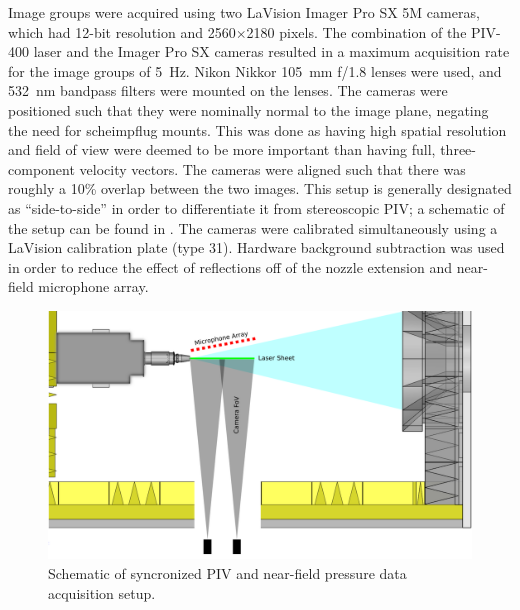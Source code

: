 Image groups were acquired using two LaVision Imager Pro SX 5M cameras, which had 12-bit resolution and 2560$\times$2180 pixels.
The combination of the PIV-400 laser and the Imager Pro SX cameras resulted in a maximum acquisition rate for the image groups of 5~Hz.
Nikon Nikkor 105~mm f/1.8 lenses were used, and 532~nm bandpass filters were mounted on the lenses.
The cameras were positioned such that they were nominally normal to the image plane, negating the need for scheimpflug mounts.
This was done as having high spatial resolution and field of view were deemed to be more important than having full, three-component velocity vectors.
The cameras were aligned such that there was roughly a 10\% overlap between the two images.
This setup is generally designated as ``side-to-side'' in order to differentiate it from stereoscopic PIV; a schematic of the setup can be found in .
The cameras were calibrated simultaneously using a LaVision calibration plate (type 31). 
Hardware background subtraction was used in order to reduce the effect of reflections off of the nozzle extension and near-field microphone array.
\begin{figure}
	\centering
	\includegraphics[width=6in]{Figures/ch2_piv_setup.png}
	\caption{Schematic of syncronized PIV and near-field pressure data acquisition setup.}
	\label{fig:piv_setup}
\end{figure}

